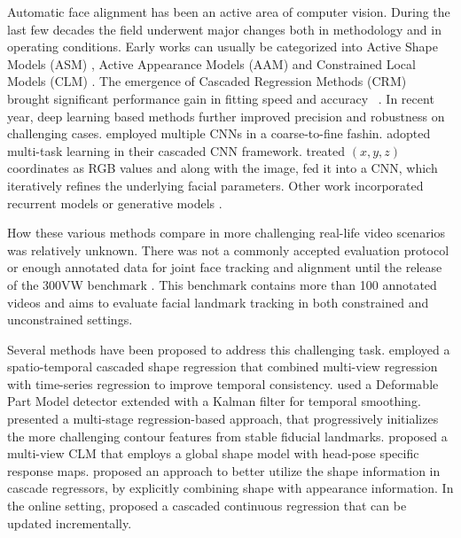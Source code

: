 \documentclass[letterpaper]{article} %
\begin{document}
Automatic face alignment has been an active area of computer vision. During the last few decades the field underwent major changes both in methodology and in operating conditions. Early works can usually be categorized into Active Shape Models (ASM) \cite{Cootes1992,Cootes1993}, Active Appearance Models (AAM) \cite{Cootes1998,Gross2005,Matthews2004} and Constrained Local Models (CLM) \cite{Saragih2011,Sangineto13,Baltrusaitis2012,Yu2013}. The emergence of Cascaded Regression Methods (CRM) ~\cite{Cao2013,Yang2013,Xiong2013,Xiong2015,Tzimiropoulos2015,Zhu2015,Yang2015FacialST,Deng2016M3CM} brought significant performance gain in fitting speed and accuracy ~\cite{Kazemi2014,Ren2014}. In recent year, deep learning based methods further improved precision and robustness on challenging cases. \cite{Fan2016ApproachingHL} employed multiple CNNs in a coarse-to-fine fashin. \cite{Zhang2016SP} adopted multi-task learning in their cascaded CNN framework. \cite{Zhu2016FaceAA} treated $(x, y, z)$ coordinates as RGB values and along with the image, fed it into a CNN, which iteratively refines the underlying facial parameters. Other work incorporated recurrent models \cite{Trigeorgis_2016_CVPR,Peng2016ARE} or generative models \cite{Zhang_2016_CVPR}.

How these various methods compare in more challenging real-life video scenarios was relatively unknown. There was not a commonly accepted evaluation protocol or enough annotated data for joint face tracking and alignment until the release of the 300VW benchmark \cite{shen2015first,Chrysos2017ACP}. This benchmark contains more than 100 annotated videos and aims to evaluate facial landmark tracking in both constrained and unconstrained settings.

Several methods have been proposed to address this challenging task.  \cite{Yang2015FacialST} employed a spatio-temporal cascaded shape regression that combined multi-view regression with time-series regression to improve temporal consistency. \cite{uricar2015real} used a Deformable Part Model detector extended with a Kalman filter for temporal smoothing. \cite{Xiao2015FacialLD} presented a multi-stage regression-based approach, that progressively initializes the more challenging contour features from stable fiducial landmarks. \cite{Rajamanoharan2015MultiviewCL} proposed a multi-view CLM that employs a global shape model with head-pose specific response maps. \cite{Wu2015ShapeAR} proposed an approach to better utilize the shape information in cascade regressors, by explicitly combining shape with appearance information.  In the online setting, \cite{SnchezLozano2016CascadedCR} proposed a cascaded continuous regression that can be updated incrementally.
\end{document}
